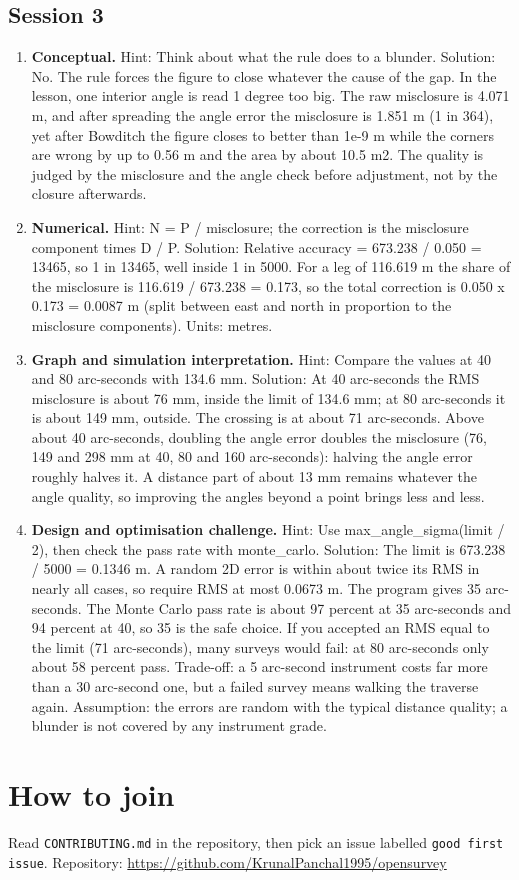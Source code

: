 \documentclass[11pt,a4paper]{article}
\begin{document}
\subsection*{Session 3}
\begin{enumerate}[nosep]
\item \textbf{Conceptual.} Hint: Think about what the rule does to a blunder. Solution: No. The rule forces the figure to close whatever the cause of the gap. In the lesson, one interior angle is read 1 degree too big. The raw misclosure is 4.071 m, and after spreading the angle error the misclosure is 1.851 m (1 in 364), yet after Bowditch the figure closes to better than 1e-9 m while the corners are wrong by up to 0.56 m and the area by about 10.5 m2. The quality is judged by the misclosure and the angle check before adjustment, not by the closure afterwards.
\item \textbf{Numerical.} Hint: N = P / misclosure; the correction is the misclosure component times D / P. Solution: Relative accuracy = 673.238 / 0.050 = 13465, so 1 in 13465, well inside 1 in 5000. For a leg of 116.619 m the share of the misclosure is 116.619 / 673.238 = 0.173, so the total correction is 0.050 x 0.173 = 0.0087 m (split between east and north in proportion to the misclosure components). Units: metres.
\item \textbf{Graph and simulation interpretation.} Hint: Compare the values at 40 and 80 arc-seconds with 134.6 mm. Solution: At 40 arc-seconds the RMS misclosure is about 76 mm, inside the limit of 134.6 mm; at 80 arc-seconds it is about 149 mm, outside. The crossing is at about 71 arc-seconds. Above about 40 arc-seconds, doubling the angle error doubles the misclosure (76, 149 and 298 mm at 40, 80 and 160 arc-seconds): halving the angle error roughly halves it. A distance part of about 13 mm remains whatever the angle quality, so improving the angles beyond a point brings less and less.
\item \textbf{Design and optimisation challenge.} Hint: Use max\_angle\_sigma(limit / 2), then check the pass rate with monte\_carlo. Solution: The limit is 673.238 / 5000 = 0.1346 m. A random 2D error is within about twice its RMS in nearly all cases, so require RMS at most 0.0673 m. The program gives 35 arc-seconds. The Monte Carlo pass rate is about 97 percent at 35 arc-seconds and 94 percent at 40, so 35 is the safe choice. If you accepted an RMS equal to the limit (71 arc-seconds), many surveys would fail: at 80 arc-seconds only about 58 percent pass. Trade-off: a 5 arc-second instrument costs far more than a 30 arc-second one, but a failed survey means walking the traverse again. Assumption: the errors are random with the typical distance quality; a blunder is not covered by any instrument grade.
\end{enumerate}

\section{How to join}
Read \texttt{CONTRIBUTING.md} in the repository, then pick an issue labelled \texttt{good first issue}. Repository: \url{https://github.com/KrunalPanchal1995/opensurvey}
\end{document}
